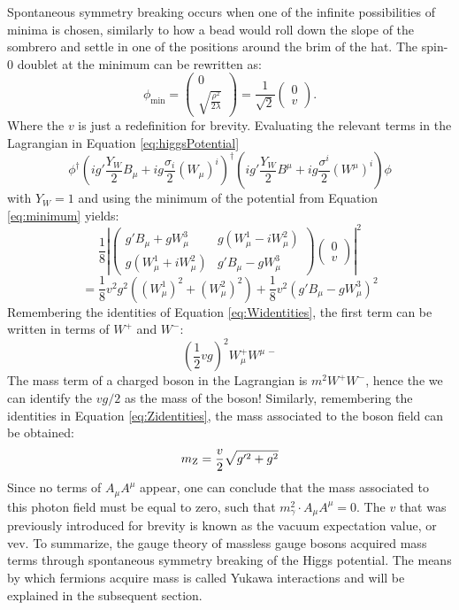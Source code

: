 Spontaneous symmetry breaking occurs when one of the infinite possibilities of minima is chosen, similarly to how a bead would roll down the slope of the sombrero and settle in one of the positions around the brim of the hat.  
The spin-0 doublet at the minimum can be rewritten as:
\begin{equation}
\phi_{\mathrm{min}}=\begin{pmatrix} 0\\ \sqrt{\frac{\rho^{2}}{2\lambda}}\end{pmatrix}=\frac{1}{\sqrt{2}}\begin{pmatrix} 0\\ v\end{pmatrix}.
\label{eq:minimum}
\end{equation}
Where the $v$ is just a redefinition for brevity. 
Evaluating the relevant terms in the Lagrangian in Equation \ref{eq:higgsPotential} 
\begin{equation}
\phi^{\dagger}\left( ig'\frac{Y_{W}}{2}B_{\mu}+ig\frac{\sigma_{i}}{2}(W_{\mu})^{i}\right)^{\dagger}\left(ig'\frac{Y_{W}}{2}B^{\mu}+ig\frac{\sigma^{i}}{2}(W^{\mu})^{i}\right)\phi
\end{equation}
with $Y_{W}=1$ and using the minimum of the potential from Equation \ref{eq:minimum} yields:
\begin{equation}
\frac{1}{8}\left|\begin{pmatrix} g'B_{\mu}+gW_{\mu}^{3} & g(W_{\mu}^{1}-iW_{\mu}^{2}) \\ g(W_{\mu}^{1}+iW_{\mu}^{2}) & g'B_{\mu}-gW_{\mu}^{3} \end{pmatrix} \begin{pmatrix} 0\\ v\end{pmatrix}\right|^{2}
\end{equation}
\begin{equation}
=\frac{1}{8}v^{2}g^{2}\left((W_{\mu}^{1})^{2} +(W_{\mu}^{2})^{2} \right)+\frac{1}{8}v^{2}(g'B_{\mu}-gW_{\mu}^{3})^{2}
\end{equation}
Remembering the identities of Equation \ref{eq:Widentities}, the first term can be written in terms of $W^{+}$ and $W^{-}$:
\begin{equation}
\left(\frac{1}{2}vg\right)^{2}W_{\mu}^{+}W^{\mu\,-}
\end{equation}
The mass term of a charged boson in the Lagrangian is $m^{2}W^{+}W^{-}$, hence the we can identify the $vg/2$ as the mass of the \PW boson!
Similarly, remembering the identities in Equation \ref{eq:Zidentities}, the mass associated to the \PZ boson field can be obtained:
\begin{equation}
m_{\mathrm{Z}}=\frac{v}{2}\sqrt{g'^{2}+g^{2}}
\end{equation}
Since no terms of $A_{\mu}A^{\mu}$ appear, one can conclude that the mass associated to this photon field must be equal to zero, such that $m_{\gamma}^{2}\cdot A_{\mu}A^{\mu}=0$.
The $v$ that was previously introduced for brevity is known as the vacuum expectation value, or vev. 
To summarize, the gauge theory of massless gauge bosons acquired mass terms through spontaneous symmetry breaking of the Higgs potential.  
The means by which fermions acquire mass is called Yukawa interactions and will be explained in the subsequent section. 
